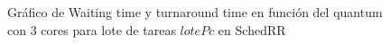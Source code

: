 \begin{figure}[H]
\hfill
{}
\hfill
{}
\hfill
\caption{Gráfico de Waiting time y turnaround time en función del quantum con 3 cores para lote de tareas $lotePc$ en SchedRR}
\end{figure}

